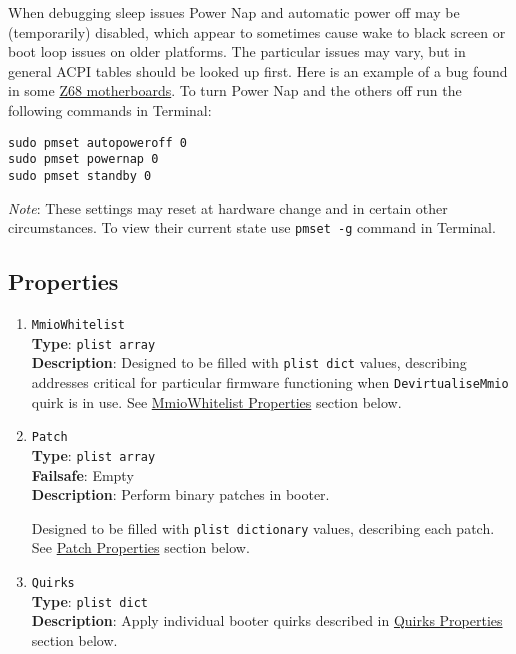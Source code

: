 \documentclass[]{article}
\begin{document}
When debugging sleep issues Power Nap and automatic power off may be (temporarily) disabled,
which appear to sometimes cause wake to black screen or boot loop
issues on older platforms. The particular issues may vary, but in general ACPI tables should be looked up first.
Here is an example of a bug found in some
\href{http://www.insanelymac.com/forum/topic/329624-need-cmos-reset-after-sleep-only-after-login/#entry2534645}{Z68 motherboards}.
To turn Power Nap and the others off run the following commands in Terminal:
\begin{lstlisting}[label=powernap, style=ocbash]
sudo pmset autopoweroff 0
sudo pmset powernap 0
sudo pmset standby 0
\end{lstlisting}

\emph{Note}: These settings may reset at hardware change and in certain other circumstances.
To view their current state use \texttt{pmset -g} command in Terminal.

\subsection{Properties}\label{booterprops}

\begin{enumerate}

\item
  \texttt{MmioWhitelist}\\
  \textbf{Type}: \texttt{plist\ array}\\
  \textbf{Description}: Designed to be filled with \texttt{plist\ dict} values,
  describing addresses critical for particular firmware functioning when
  \texttt{DevirtualiseMmio} quirk is in use. See \hyperref[booterpropsmmio]{MmioWhitelist Properties}
  section below.
  
\item
  \texttt{Patch}\\
  \textbf{Type}: \texttt{plist\ array}\\
  \textbf{Failsafe}: Empty\\
  \textbf{Description}: Perform binary patches in booter.
  
  Designed to be filled with \texttt{plist\ dictionary} values, describing each
  patch. See \hyperref[booterpropspatch]{Patch Properties} section below.

\item
  \texttt{Quirks}\\
  \textbf{Type}: \texttt{plist\ dict}\\
  \textbf{Description}: Apply individual booter quirks described
  in \hyperref[booterpropsquirks]{Quirks Properties} section below.

\end{enumerate}
\end{document}
